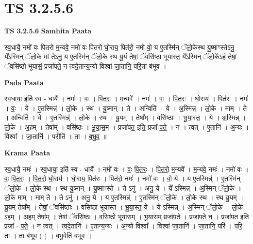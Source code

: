 \documentclass[17pt]{extarticle}
\begin{document}

\section{ TS 3.2.5.6 }

\textbf{TS 3.2.5.6 } \newline
\textbf{Samhita Paata} \newline

स्व॒धायै॒ नमो॑ वः पितरो म॒न्यवे॒ नमो॑ वः पितरो घो॒राय॒ पित॑रो॒ नमो॑ वो॒ य ए॒तस्मि॑न् ॅलो॒केस्थ यु॒ष्माꣳस्तेऽनु॒ ये᳚ऽस्मिन् ॅलो॒के मां तेऽनु॒ य ए॒तस्मि॑न् ॅलो॒के स्थ यू॒यं तेषां॒ ॅवसि॑ष्ठा भूयास्त॒ ये᳚ऽस्मिन् ॅलो॒के॑ऽहं तेषां॒ ॅवसि॑ष्ठो भूयासं॒ प्रजा॑पते॒ न त्वदे॒तान्य॒न्यो विश्वा॑ जा॒तानि॒ परि॒ता ब॑भूव । \newline

\textbf{Pada Paata} \newline

स्व॒धाया॒ इति॑ स्व - धायै᳚ । नमः॑ । वः॒ । पि॒त॒रः॒ । म॒न्यवे᳚ । नमः॑ । वः॒ । पि॒त॒रः॒ । घो॒राय॑ । पित॑रः । नमः॑ । वः॒ । ये । ए॒तस्मिन्न्॑ । लो॒के । स्थ । यु॒ष्मान् । ते । अन्विति॑ । ये । अ॒स्मिन्न् । लो॒के । माम् । ते । अन्विति॑ । ये । ए॒तस्मिन्न्॑ । लो॒के । स्थ । यू॒यम् । तेषा᳚म् । वसि॑ष्ठाः । भू॒या॒स्त॒ । ये । अ॒स्मिन्न् । लो॒के । अ॒हम् । तेषा᳚म् । वसि॑ष्ठः । भू॒या॒स॒म् । प्रजा॑पत॒ इति॒ प्रजा᳚-प॒ते॒ । न । त्वत् । ए॒तानि॑ । अ॒न्यः । विश्वा᳚ । जा॒तानि॑ । परीति॑ । ता । ब॒भू॒व॒ ॥  \newline


\textbf{Krama Paata} \newline

स्व॒धायै॒ नमः॑ । स्व॒धाया॒ इति॑ स्व - धायै᳚ । नमो॑ वः । वः॒ पि॒त॒रः॒ । पि॒त॒रो॒ म॒न्यवे᳚ । म॒न्यवे॒ नमः॑ । नमो॑ वः । वः॒ पि॒त॒रः॒ । पि॒त॒रो॒ घो॒राय॑ । घो॒राय॒ पित॑रः । पित॑रो॒ नमः॑ । नमो॑ वः । वो॒ ये । य ए॒तस्मिन्न्॑ । ए॒तस्मि॑न् ॅलो॒के । लो॒के स्थ । स्थ यु॒ष्मान् । यु॒ष्माꣳस्ते । ते ऽनु॑ । अनु॒ ये । ये᳚ ऽस्मिन्न् । अ॒स्मिन् ॅलो॒के । लो॒के माम् । माम् ते । ते ऽनु॑ । अनु॒ ये । य ए॒तस्मिन्न्॑ । ए॒तस्मि॑न् ॅलो॒के । लो॒के स्थ । स्थ यू॒यम् । यू॒यम् तेषा᳚म् । तेषां॒ ॅवसि॑ष्ठाः । वसि॑ष्ठा भूयास्त । भू॒या॒स्त॒ ये । ये᳚ ऽस्मिन्न् । अ॒स्मिन् ॅलो॒के । लो॒के॑ ऽहम् । अ॒हम् तेषा᳚म् । तेषां॒ ॅवसि॑ष्ठः । वसि॑ष्ठो भूयासम् । भू॒या॒स॒म् प्रजा॑पते । प्रजा॑पते॒ न । प्रजा॑पत॒ इति॒ प्रजा᳚ - प॒ते॒ । न त्वत् । त्वदे॒तानि॑ । ए॒तान्य॒न्यः । अ॒न्यो विश्वा᳚ । विश्वा॑ जा॒तानि॑ । जा॒तानि॒ परि॑ । परि॒ ता । ता ब॑भूव ( ) । ब॒भू॒वेति॑ बभूव । \newline
\end{document}

